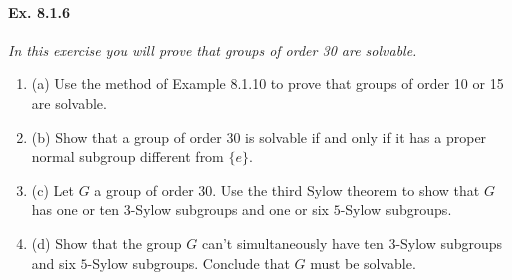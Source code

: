 \documentclass[11pt,a4paper]{article}
\newcommand{\be} {\begin{enumerate}}
\newcommand{\ee} {\end{enumerate}}
\begin{document}
\paragraph{Ex. 8.1.6}

{\it In this exercise you will prove that groups of order 30 are solvable.
\be
\item[(a)] Use the method of Example 8.1.10 to prove that groups of order 10 or 15 are solvable.
\item[(b)] Show that a group of order 30 is solvable if and only if it has a proper normal subgroup different from $\{e\}$.
\item[(c)] Let $G$ a group of order 30. Use the third Sylow theorem to show that $G$ has one or ten $3$-Sylow subgroups and one or six $5$-Sylow subgroups.
\item[(d)] Show that the group $G$ can't simultaneously have ten $3$-Sylow subgroups and six $5$-Sylow subgroups. Conclude that $G$ must be solvable.
\ee
}
\end{document}
